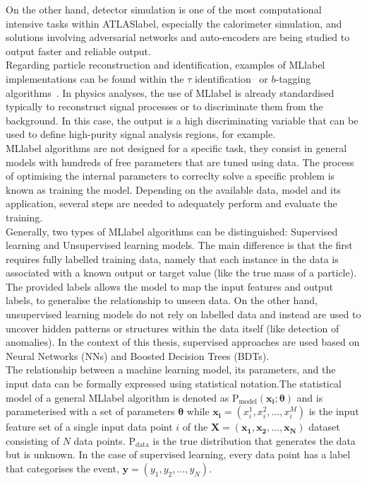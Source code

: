 On the other hand, detector simulation is one of the most computational intensive tasks within \acrshort{ATLASlabel}, especially the calorimeter simulation, and solutions involving adversarial networks and auto-encoders are being studied to output faster and reliable output.\\

Regarding particle reconstruction and identification, examples of \acrshort{MLlabel} implementations can be found within the $\tau$ identification~\cite{ATLAS:2019uhp} or $b$-tagging algorithms~\cite{ATL-PHYS-PUB-2020-014}. In physics analyses, the use of \acrshort{MLlabel} is already standardised typically to reconstruct signal processes or to discriminate them from the background. In this case, the output is a high discriminating variable that can be used to define high-purity signal analysis regions, for example.\\

\acrshort{MLlabel} algorithms are not designed for a specific task, they consist in general models with hundreds of free parameters that are tuned using data. The process of optimising the internal parameters to correclty solve a specific problem is known as training the model. Depending on the available data, model and its application, several steps are needed to adequately perform and evaluate the training.\\

Generally, two types of \acrshort{MLlabel} algorithms can be distinguished: Supervised learning and Unsupervised learning models. The main difference is that the first requires fully labelled training data, namely that each instance in the data is associated with a known output or target value (like the true mass of a particle). The provided labels allows the model to map the input features and output labels, to generalise the relationship to unseen data. On the other hand, unsupervised learning models do not rely on labelled data and instead are used to uncover hidden patterns or structures within the data itself (like detection of anomalies). In the context of this thesis, supervised approaches are used based on Neural Networks (NNs) and Boosted Decision Trees (BDTs).\\

The relationship between a machine learning model, its parameters, and the input data can be formally expressed using statistical notation.The statistical model of a general \acrshort{MLlabel} algorithm is denoted as $\text{P}_\text{model}(\mathbf{x_i}; \boldsymbol{\theta})$ and is parameterised with a set of parameters $\boldsymbol{\theta}$ while $\mathbf{x_i}=(x_i^1,x_i^2,...,x_i^M)$ is the input feature set of a single input data point $i$ of the $\mathbf{X}=(\mathbf{x_1},\mathbf{x_2},...,\mathbf{x_N})$ dataset consisting of $N$ data points. $\text{P}_\text{data}$ is the true distribution that generates the data but is unknown. In the case of supervised learning, every data point has a label that categorises the event, $\mathbf{y}=(y_1,y_2,...,y_N)$.

